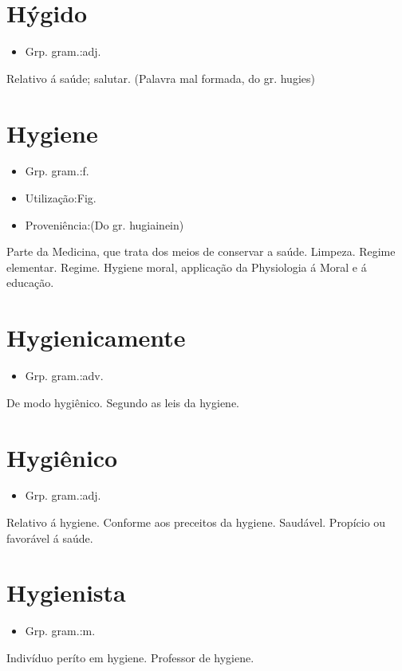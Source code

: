 \documentclass{article}
\begin{document}
\section{Hýgido}
\begin{itemize}
\item {Grp. gram.:adj.}
\end{itemize}
Relativo á saúde; salutar.
(Palavra mal formada, do gr. \textunderscore hugies\textunderscore )
\section{Hygiene}
\begin{itemize}
\item {Grp. gram.:f.}
\end{itemize}
\begin{itemize}
\item {Utilização:Fig.}
\end{itemize}
\begin{itemize}
\item {Proveniência:(Do gr. \textunderscore hugiainein\textunderscore )}
\end{itemize}
Parte da Medicina, que trata dos meios de conservar a saúde.
Limpeza.
Regime elementar.
Regime.
\textunderscore Hygiene moral\textunderscore , applicação da Physiologia á Moral e á educação.
\section{Hygienicamente}
\begin{itemize}
\item {Grp. gram.:adv.}
\end{itemize}
De modo hygiênico.
Segundo as leis da hygiene.
\section{Hygiênico}
\begin{itemize}
\item {Grp. gram.:adj.}
\end{itemize}
Relativo á hygiene.
Conforme aos preceitos da hygiene.
Saudável.
Propício ou favorável á saúde.
\section{Hygienista}
\begin{itemize}
\item {Grp. gram.:m.}
\end{itemize}
Indivíduo períto em hygiene.
Professor de hygiene.
\end{document}
